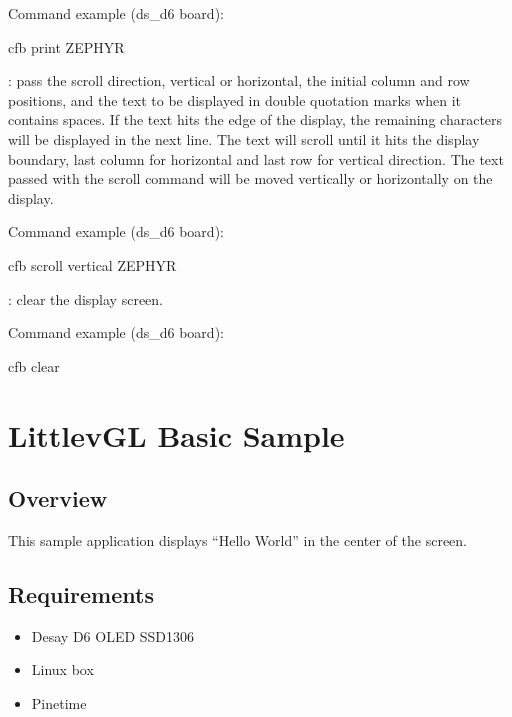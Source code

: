 \documentclass[letterpaper,10pt,english]{sphinxmanual}
\begin{document}
Command example (ds\_d6 board):

\begin{sphinxVerbatim}[commandchars=\\\{\}]
 cfb print   ZEPHYR
\end{sphinxVerbatim}

: pass the scroll direction, vertical or horizontal, the initial
column and row positions, and the text to be displayed in double quotation
marks when it contains spaces. If the text hits the edge of the display, the
remaining characters will be displayed in the next line. The text will scroll
until it hits the display boundary, last column for horizontal and last row
for vertical direction. The text passed with the scroll command will be moved
vertically or horizontally on the display.

Command example (ds\_d6 board):

\begin{sphinxVerbatim}[commandchars=\\\{\}]
 cfb scroll vertical   ZEPHYR
\end{sphinxVerbatim}

: clear the display screen.

Command example (ds\_d6 board):

\begin{sphinxVerbatim}[commandchars=\\\{\}]
 cfb clear
\end{sphinxVerbatim}


\section{LittlevGL Basic Sample}
\label{\detokenize{samples/appsampleslvglREADME:littlevgl-basic-sample}}\label{\detokenize{samples/appsampleslvglREADME:lvgl-sample}}\label{\detokenize{samples/appsampleslvglREADME::doc}}

\subsection{Overview}
\label{\detokenize{samples/appsampleslvglREADME:overview}}
This sample application displays “Hello World” in the center of the screen.


\subsection{Requirements}
\label{\detokenize{samples/appsampleslvglREADME:requirements}}\begin{itemize}
\item {} 
Desay D6 OLED SSD1306

\item {} 
Linux box

\item {} 
Pinetime

\end{itemize}
\end{document}
